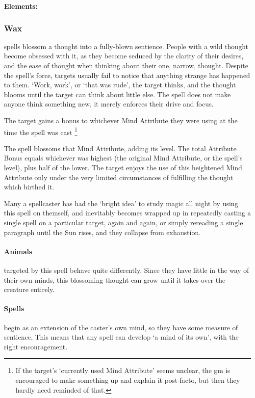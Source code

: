 \begin{multicols}{2}
\textbf{Elements:}


\subsubsection{Wax}
  spells blossom a thought into a fully-blown sentience.
  People with a wild thought become obsessed with it, as they become seduced by the clarity of their desires, and the ease of thought when thinking about their one, narrow, thought.
  Despite the spell's force, targets usually fail to notice that anything strange has happened to them.
  `Work, work', or `that was rude', the target thinks, and the thought blooms until the target can think about little else.
  The spell does not make anyone think something new, it merely enforces their drive and focus.

  The target gains a bonus to whichever Mind Attribute they were using at the time the spell was cast%
  \footnote{If the target's `currently used Mind Attribute' seems unclear, the \gls{gm} is encouraged to make something up and explain it post-facto, but then they hardly need reminded of that.}

  The spell blossoms that Mind Attribute, adding its level.
  The total Attribute Bonus equals whichever was highest (the original Mind Attribute, or the spell's level), plus half of the lower.%
  The target enjoys the use of this heightened Mind Attribute only under the very limited circumstances of fulfilling the thought which birthed it.

  Many a spellcaster has had the `bright idea' to study magic all night by using this spell on themself, and inevitably becomes wrapped up in repeatedly casting a single spell on a particular target, again and again, or simply rereading a single paragraph until the Sun rises, and they collapse from exhaustion.

\paragraph{Animals}
  targeted by this spell behave quite differently.
  Since they have little in the way of their own minds, this blossoming thought can grow until it takes over the creature entirely.

\paragraph{Spells}
  begin as an extension of the caster's own mind, so they have some measure of sentience.
  This means that any spell can develop `a mind of its own', with the right encouragement.


\end{multicols}
